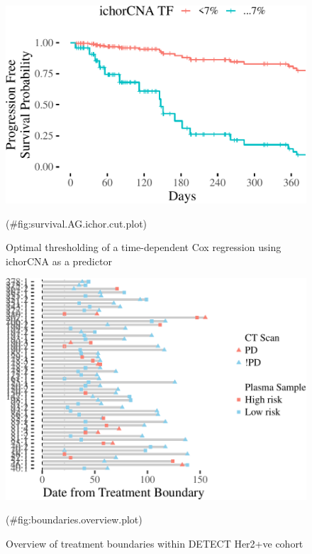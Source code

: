 \documentclass[]{article}
\begin{document}
\begin{figure}

{\centering \includegraphics{detect.her2.manuscript_files/figure-latex/survival.AG.ichor.cut.plot-1} 

}

\caption{Optimal thresholding of a time-dependent Cox regression using ichorCNA as a predictor}(\#fig:survival.AG.ichor.cut.plot)
\end{figure}

\begin{figure}

{\centering \includegraphics{detect.her2.manuscript_files/figure-latex/boundaries.overview.plot-1} 

}

\caption{Overview of treatment boundaries within DETECT Her2+ve cohort}(\#fig:boundaries.overview.plot)
\end{figure}
\end{document}
